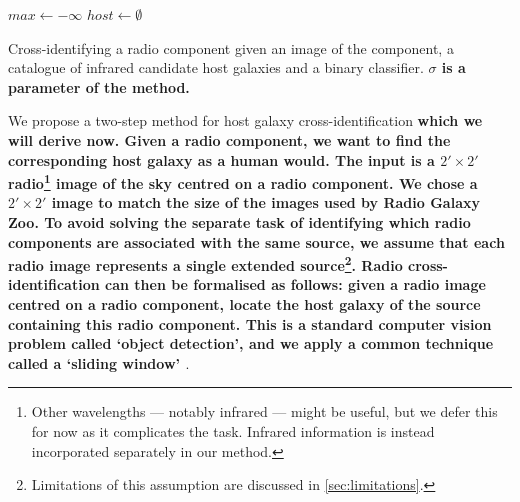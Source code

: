 \documentclass[fleqn,usenatbib,usedcolumn]{mnras}
\newcommand{\edited}[1]{{\bf {#1}}}
\begin{document}
    \begin{algorithm}

        $max \leftarrow -\infty$\;
        $host \leftarrow \emptyset$\;

        \caption{Cross-identifying a radio component given an image of the component, a catalogue of infrared candidate host galaxies and a binary classifier.
          \edited{$\sigma$ is a parameter of the method.}}
        \label{alg:xid}
    \end{algorithm}

    We propose a two-step method for host galaxy cross-identification
    \edited{which we will derive now. Given a radio component, we want to find
    the corresponding host galaxy as a human would. The input is a $2' \times
    2'$ radio\footnote{Other wavelengths --- notably infrared --- might be
    useful, but we defer this for now as it complicates the task. Infrared
    information is instead incorporated separately in our method.} image of
    the sky centred on a radio component. \edited{We chose a $2' \times 2'$ image to match} the size of the images used
    by Radio Galaxy Zoo. To avoid solving the separate task of identifying
    which radio components are associated with the same source, we assume
    that each radio image represents a single extended
    source\footnote{Limitations of this assumption are discussed in
    \autoref{sec:limitations}.}. Radio cross-identification can then
    be formalised as follows: given a radio image centred on a radio
    component, locate the host galaxy of the source containing this radio
    component. This is a standard computer vision problem called `object
    detection', and we apply a common technique called a `sliding window'
    \citep{rowley1996facedetection}}.
\end{document}
